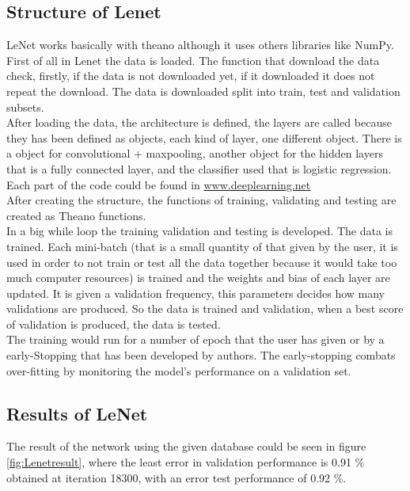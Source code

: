 \subsection{Structure of Lenet}
LeNet works basically with theano although it uses others libraries like NumPy.\\

First of all in Lenet the data is loaded. The function that download the data check, firstly, if the data is not downloaded yet, if it downloaded it does not repeat the download. The data is downloaded split into train, test and validation subsets.\\

After loading the data, the architecture is defined, the layers are called because they has been defined as objects, each kind of layer, one different object. There is a object for convolutional + maxpooling, another object for the hidden layers that is a fully connected layer, and the classifier used that is logistic regression. Each part of the code could be found in \url{www.deeplearning.net}\\

After creating the structure, the functions of training, validating and testing are created as Theano functions.\\

In a big while loop the training validation and testing is developed. The data is trained. Each mini-batch (that is a small quantity of that given by the user, it is used in order to not train or test all the data together because it would take too much computer resources) is trained and the weights and bias of each layer are updated. It is given a validation frequency, this parameters decides how many validations are produced. So the data is trained and validation, when a best score of validation is produced, the data is tested.\\

The training would run for a number of epoch that the user has given or by a early-Stopping that has been developed by authors. The early-stopping combats over-fitting by monitoring the model's performance on a validation set.\\

\subsection{Results of LeNet}
The result of the network using the given database could be seen in figure \ref{fig:Lenetresult}, where the least error in validation performance is 0.91 \% obtained at iteration 18300, with an error test performance of 0.92 \%. \\

